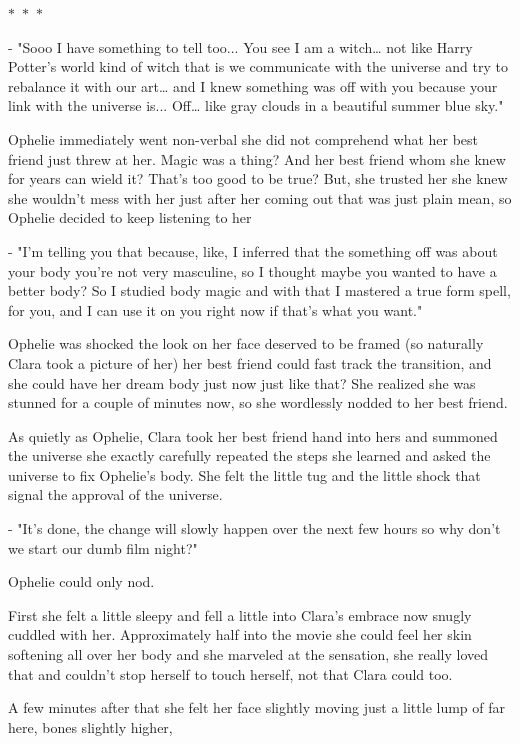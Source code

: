 \documentclass[hidelinks,12pt]{book}
\newcommand\sep{\begin{center}
  \boldmath $\ast$~$\ast$~$\ast$
\end{center}}
\begin{document}
\sep

- "Sooo I have something to tell too... You see I am a witch… not like Harry Potter's world kind of witch that is we 
communicate with the universe and try to rebalance it with our art… and I knew something was off with you because 
your link with the universe is... Off… like gray clouds in a beautiful summer blue sky."\par 
\bigskip
Ophelie immediately went non-verbal she did not comprehend what her best friend just threw at her. Magic was a thing? 
And her best friend whom she knew for years can wield it? That's too good to be true? But, she trusted her she knew she 
wouldn't mess with her just after her coming out that was just plain mean, so Ophelie decided to keep listening to her\par
\bigskip
- "I'm telling you that because, like, I inferred that the something off was about your body you're not very masculine, 
so I thought maybe you wanted to have a better body? So I studied body magic and with that I mastered a true form spell, 
for you, and I can use it on you right now if that's what you want."\par 
\bigskip
Ophelie was shocked the look on her face deserved to be framed (so naturally Clara took a picture of her) her best 
friend could fast track the transition, and she could have her dream body just now just like that? She realized 
she was stunned for a couple of minutes now, so she wordlessly nodded to her best friend.\par
\bigskip
As quietly as Ophelie, Clara took her best friend hand into hers and summoned the universe she exactly carefully 
repeated the steps she learned and asked the universe to fix Ophelie's body. She felt the little tug and the little 
shock that signal the approval of the universe.\par 
\bigskip
- "It's done, the change will slowly happen over the next few hours so why don't we start our dumb film night?"\par 
Ophelie could only nod.\par 
\bigskip
First she felt a little sleepy and fell a little into Clara's embrace now snugly cuddled with her. 
Approximately half into the movie she could feel her skin softening all over her body and she marveled at 
the sensation, she really loved that and couldn't stop herself to touch herself, not that Clara could too.\par 
\bigskip
A few minutes after that she felt her face slightly moving just a little lump of far here, bones slightly higher, 
\end{document}
